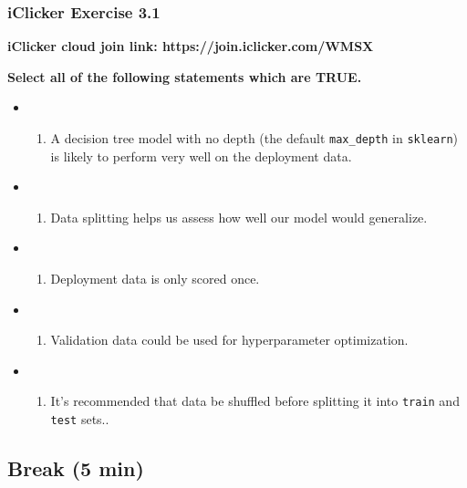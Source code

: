 \documentclass[11pt]{article}
\providecommand{\tightlist}{%
      \setlength{\itemsep}{0pt}\setlength{\parskip}{0pt}}
\begin{document}
    \subsubsection{iClicker Exercise 3.1}\label{iclicker-exercise-3.1}

\textbf{iClicker cloud join link: https://join.iclicker.com/WMSX}

\textbf{Select all of the following statements which are TRUE.}

\begin{itemize}
\tightlist
\item
  \begin{enumerate}
  \def\labelenumi{(\Alph{enumi})}
  \tightlist
  \item
    A decision tree model with no depth (the default \texttt{max\_depth}
    in \texttt{sklearn}) is likely to perform very well on the
    deployment data.
  \end{enumerate}
\item
  \begin{enumerate}
  \def\labelenumi{(\Alph{enumi})}
  \setcounter{enumi}{1}
  \tightlist
  \item
    Data splitting helps us assess how well our model would generalize.
  \end{enumerate}
\item
  \begin{enumerate}
  \def\labelenumi{(\Alph{enumi})}
  \setcounter{enumi}{2}
  \tightlist
  \item
    Deployment data is only scored once.\\
  \end{enumerate}
\item
  \begin{enumerate}
  \def\labelenumi{(\Alph{enumi})}
  \setcounter{enumi}{3}
  \tightlist
  \item
    Validation data could be used for hyperparameter optimization.
  \end{enumerate}
\item
  \begin{enumerate}
  \def\labelenumi{(\Alph{enumi})}
  \setcounter{enumi}{4}
  \tightlist
  \item
    It's recommended that data be shuffled before splitting it into
    \texttt{train} and \texttt{test} sets..
  \end{enumerate}
\end{itemize}

    

    \subsection{Break (5 min)}\label{break-5-min}
\end{document}
